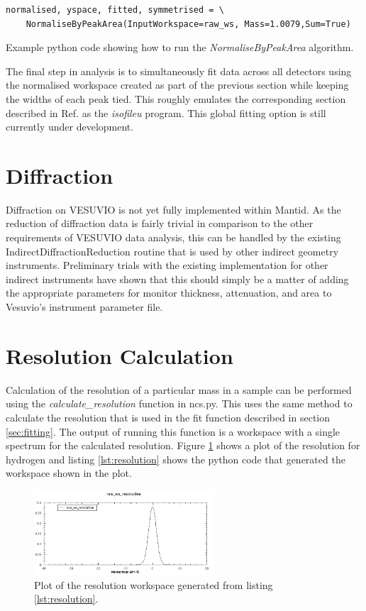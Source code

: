 \documentclass[paper=a4, fontsize=11pt]{scrartcl}	%
\numberwithin{equation}{section}															%
\numberwithin{figure}{section}																%
\numberwithin{table}{section}
\begin{document}
\begin{listing}[H]
\begin{verbatim}
normalised, yspace, fitted, symmetrised = \
	NormaliseByPeakArea(InputWorkspace=raw_ws, Mass=1.0079,Sum=True)
\end{verbatim}
\caption{Example python code showing how to run the \textit{NormaliseByPeakArea} algorithm.}
\label{lst:plot-angle}
\end{listing}

The final step in analysis is to simultaneously fit data across all detectors using the normalised workspace created as part of the previous section while keeping the widths of each peak tied. This roughly emulates the corresponding section described in Ref. \cite{mayers2010user} as the \textit{isofileu} program. This global fitting option is still currently under development.


\section{Diffraction}
\label{sec:diffraction}
Diffraction on VESUVIO is not yet fully implemented within Mantid. As the reduction of diffraction data is fairly trivial in comparison to the other requirements of VESUVIO data analysis, this can be handled by the existing IndirectDiffractionReduction routine that is used by other indirect geometry instruments. Preliminary trials with the existing implementation for other indirect instruments have shown that this should simply be a matter of adding the appropriate parameters for monitor thickness, attenuation, and area to Vesuvio's instrument parameter file.

\section{Resolution Calculation}
Calculation of the resolution of a particular mass in a sample can be performed using the \textit{calculate\_resolution} function in ncs.py. This uses the same method to calculate the resolution that is used in the fit function described in section \ref{sec:fitting}. The output of running this function is a workspace with a single spectrum for the calculated resolution. Figure \ref{fig:resolution} shows a plot of the resolution for hydrogen and listing \ref{lst:resolution} shows the python code that generated the workspace shown in the plot.

\begin{figure}[H]
\centering
\includegraphics[width=0.6\textwidth]{img/resolution.png}
\caption{Plot of the resolution workspace generated from listing \ref{lst:resolution}.}
\label{fig:resolution}
\end{figure}
\end{document}

